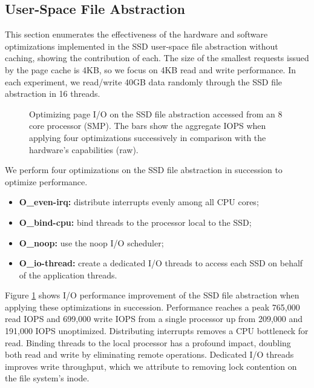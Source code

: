 \subsection{User-Space File Abstraction}
This section enumerates the effectiveness of the hardware and software
optimizations implemented in the SSD user-space file abstraction without caching,
showing the contribution of each. The size of the smallest
requests issued by the page cache is 4KB, so we focus on 4KB read and write
performance. In each experiment, we read/write 40GB data randomly through
the SSD file abstraction in 16 threads.

\begin{figure}[tb]
\begin{center}
\vspace{-15pt}

\vspace{-15pt}
\caption{Optimizing page I/O on the SSD file abstraction accessed from
	an 8 core processor (SMP).
The bars show the aggregate IOPS when applying four optimizations successively
in comparison with the hardware's capabilities (raw).}
\label{ssd_impr}
\end{center}
\end{figure}

We perform four optimizations on the SSD file abstraction in succession
to optimize performance.
\vspace{-10pt}
\begin{itemize}
\addtolength{\itemsep}{-5pt}
\item {\bf O\_even-irq:} distribute interrupts evenly among all CPU cores;
\item {\bf O\_bind-cpu:} bind threads to the processor local to the SSD;
\item {\bf O\_noop:} use the noop I/O scheduler;
\item {\bf O\_io-thread:} create a dedicated I/O threads to access each SSD on behalf of
the application threads.
\end{itemize}
\vspace{-10pt}
Figure \ref{ssd_impr} shows I/O performance improvement of the SSD
file abstraction when applying these optimizations in succession.
Performance reaches a peak 765,000 read IOPS and 699,000 write IOPS from 
a single processor up from 209,000 and 191,000 IOPS unoptimized.
Distributing interrupts removes a CPU bottleneck for read.  Binding threads 
to the local processor has a profound impact, doubling both read and write by
eliminating remote operations.
Dedicated I/O threads improves write throughput, which we attribute to 
removing lock contention on the file system's inode.

